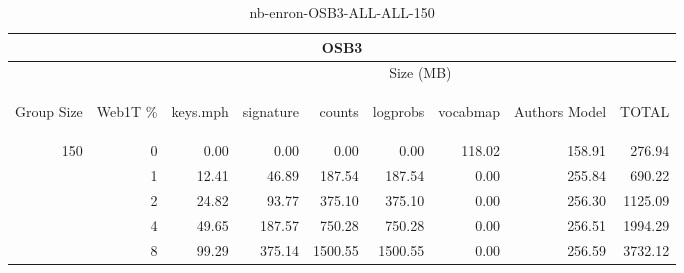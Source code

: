 \begin{center}
\begin{table}[htbp]
\begin{tabular}{ | r | r | r | r | r | r | r | r | r |}
\hline
\multicolumn{9}{|c|}{OSB3}\\
\hline
 & & \multicolumn{7}{|c|}{Size (MB)}\\ \cline{3-9}
\begin{sideways}Group Size\end{sideways} & \begin{sideways}Web1T \% \end{sideways} & \begin{sideways}keys.mph\end{sideways} & \begin{sideways}signature\end{sideways} & \begin{sideways}counts\end{sideways} & \begin{sideways}logprobs\end{sideways} & \begin{sideways}vocabmap\end{sideways} & \begin{sideways}Authors Model \end{sideways} & \begin{sideways}TOTAL\end{sideways}\\
\hline
\multirow{4}{*}{150}
 & 0 & 0.00 & 0.00 & 0.00 & 0.00 & 118.02 & 158.91 & 276.94\\ \cline{2-9}
 & 1 & 12.41 & 46.89 & 187.54 & 187.54 & 0.00 & 255.84 & 690.22\\ \cline{2-9}
 & 2 & 24.82 & 93.77 & 375.10 & 375.10 & 0.00 & 256.30 & 1125.09\\ \cline{2-9}
 & 4 & 49.65 & 187.57 & 750.28 & 750.28 & 0.00 & 256.51 & 1994.29\\ \cline{2-9}
 & 8 & 99.29 & 375.14 & 1500.55 & 1500.55 & 0.00 & 256.59 & 3732.12\\ \cline{2-9}
\hline
\end{tabular}
\caption{nb-enron-OSB3-ALL-ALL-150}
\label{table:nb-enron-OSB3-ALL-ALL-150}
\end{table}
\end{center}

